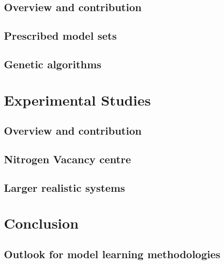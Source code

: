     \chapter*{Overview and contribution}
        
    \chapter{Prescribed model sets}\label{chapter:lattices}
        
    \chapter{Genetic algorithms}\label{chapter:ga}
        

\part{Experimental Studies}\label{part:experimental_study}
    \chapter*{Overview and contribution}
        
    \chapter{Nitrogen Vacancy centre}\label{chapter:nv}
        
    \chapter{Larger realistic systems}\label{chapter:many_qubits}
        
    
\part{Conclusion}\label{part:conclusion}
    \chapter{Outlook for model learning methodologies}\label{chapter:outlook}
        



